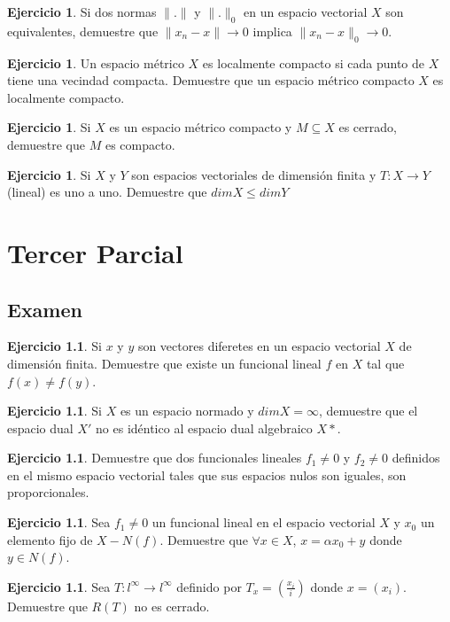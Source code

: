 \documentclass[11pt,a4paper,oneside]{report}
\theoremstyle{definition}
\newtheorem{ejercicio}[definicion]{Ejercicio}
\theoremstyle{plain}
\theoremstyle{remark}
\begin{document}
\begin{ejercicio}
  Si dos normas $\|.\|$ y $\|.\|_0$ en un espacio vectorial $X$ son equivalentes, demuestre
  que $\|x_n-x\|\rightarrow 0 $ implica $\|x_n-x\|_0\rightarrow 0$.
\end{ejercicio}

\begin{ejercicio}
  Un espacio métrico $X$ es localmente compacto si cada punto de $X$ tiene una vecindad 
  compacta. Demuestre que un espacio métrico compacto $X$ es localmente compacto.
\end{ejercicio}

\begin{ejercicio}
  Si $X$ es un espacio métrico compacto y $M \subseteq X$ es cerrado, demuestre que $M$ 
  es compacto.
\end{ejercicio}

\begin{ejercicio}
  Si $X$ y $Y$ son espacios vectoriales de dimensión finita y $T:X\rightarrow Y$ (lineal) es uno a uno.
  Demuestre que $dimX\leq dimY$
\end{ejercicio}

\chapter{Tercer Parcial}

\section{Examen}

\begin{ejercicio}
  Si $x$ y $y$ son vectores diferetes en un espacio vectorial $X$ de dimensión finita. Demuestre 
  que existe un funcional lineal $f$ en $X$ tal que $f(x) \not = f(y)$.
\end{ejercicio}

\begin{ejercicio}
  Si $X$ es un espacio normado y $dim X = \infty$, demuestre que el espacio dual 
  $X'$ no es idéntico al espacio dual algebraico $X*$.
\end{ejercicio}

\begin{ejercicio}
  Demuestre que dos funcionales lineales $f_1 \not = 0$ y $f_2 \not = 0$
  definidos en el mismo espacio vectorial tales que sus espacios nulos son iguales,
  son proporcionales.
\end{ejercicio}

\begin{ejercicio}
  Sea $f_1 \not = 0$ un funcional lineal en el espacio vectorial $X$ y $x_0$ un elemento fijo 
  de $X-N(f)$. Demuestre que $\forall x \in X$, $x=\alpha x_0 + y$ donde $y \in N(f)$.
\end{ejercicio}

\begin{ejercicio}
  Sea $T:l^{\infty}\rightarrow l^{\infty}$ definido por $T_x=(\frac{x_i}{i})$ donde $x=(x_i)$.
  Demuestre que $R(T)$ no es cerrado.
\end{ejercicio}

\printindex
\end{document}
